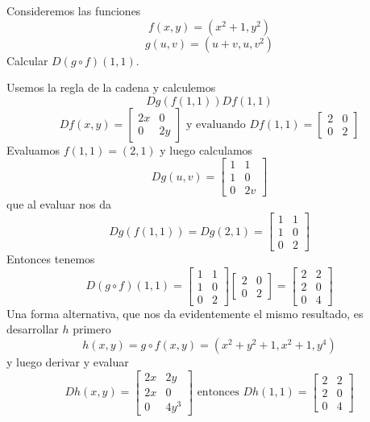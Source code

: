 \begin{ejemplo} 
Consideremos las funciones  $$f(x,y)=(x^2+1,y^2)$$
$$g(u,v)=(u+v,u,v^2)$$
Calcular $D(g\circ f)(1,1)$.

\begin{solucion}
Usemos la regla de la cadena y calculemos $$Dg(f(1,1))Df(1,1)$$
$$Df(x,y)=
\left[
\begin{array}{cc}
2x&0\\ 0&2y
\end{array}
\right] \text{ y evaluando } Df(1,1)=
\left[
\begin{array}{cc}
2&0\\ 0&2
\end{array}
\right]
$$
Evaluamos $f(1,1)=(2,1)$ y luego calculamos 
$$Dg(u,v)=
\left[
\begin{array}{cc}
1&1\\ 1&0\\ 0&2v
\end{array}
\right]
$$
que al evaluar nos da
$$
Dg(f(1,1))=Dg(2,1)=
\left[
\begin{array}{cc}
1&1\\ 1&0\\ 0&2
\end{array}
\right]$$
Entonces tenemos
$$D(g\circ f)(1,1)=
\left[
\begin{array}{cc}
1&1\\ 1&0\\ 0&2
\end{array}
\right]
\left[
\begin{array}{cc}
2&0\\ 0&2
\end{array}
\right]=
\left[
\begin{array}{cc}
2&2\\ 2&0\\ 0&4
\end{array}
\right]
$$
Una forma alternativa, que nos da evidentemente el mismo resultado, es
desarrollar $h$ primero
$$h(x,y)=g\circ f(x,y)=(x^2+y^2+1,x^2+1,y^4)$$
y luego derivar y evaluar
$$Dh(x,y)=
\left[
\begin{array}{cc}
2x &2y\\ 2x&0\\ 0&4y^3
\end{array}
\right]
\text{ entonces } Dh(1,1)=
\left[
\begin{array}{cc}
2 &2\\ 2&0\\ 0&4
\end{array}
\right]
$$
\end{solucion}
\end{ejemplo}

